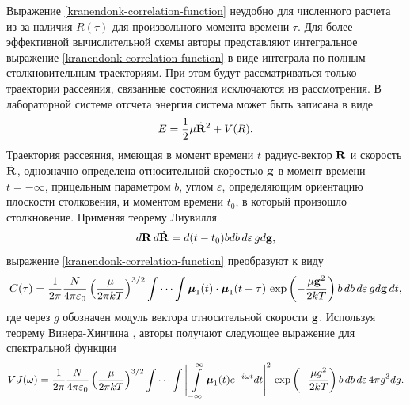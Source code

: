 Выражение \eqref{kranendonk-correlation-function} неудобно для численного расчета из-за наличия $R(\tau)$ для произвольного момента времени $\tau$. Для более эффективной вычислительной схемы авторы \cite{kranendonk1973} представляют интегральное выражение \eqref{kranendonk-correlation-function} в виде интеграла по полным столкновительным траекториям. При этом будут рассматриваться только траектории рассеяния, связанные состояния исключаются из рассмотрения. В лабораторной системе отсчета энергия система может быть записана в виде
\begin{gather}
    E = \frac{1}{2} \mu \dot{\mathbf{R}}^2 + V(R).
\end{gather}
Траектория рассеяния, имеющая в момент времени $t$ радиус-вектор $\mathbf{R}$ и скорость $\dot{\mathbf{R}}$, однозначно определена относительной скоростью $\mathbf{g}$ в момент времени $t = -\infty$, прицельным параметром $b$, углом $\varepsilon$, определяющим ориентацию плоскости столковения, и моментом времени $t_0$, в который произошло столкновение. Применяя теорему Лиувилля
\begin{gather}
    d \mathbf{R} \, d\dot{\mathbf{R}} = d(t - t_0) b db \, d\varepsilon \, g d\mathbf{g},
\end{gather}
%
выражение \eqref{kranendonk-correlation-function} преобразуют к виду
\begin{gather}
    C(\tau) = \frac{1}{2 \pi} \frac{N}{4 \pi \varepsilon_0} \left( \frac{\mu}{2 \pi k T} \right)^{3/2} \idotsint \boldsymbol{\mu}_1(t) \cdot \boldsymbol{\mu}_1(t + \tau) \, \exp \left( - \frac{\mu \mathbf{g}^2}{2 k T} \right) b \, db \, d\varepsilon \, g d \mathbf{g} \, dt, \label{correlation-function-kranendonk}
\end{gather}
%
где через $g$ обозначен модуль вектора относительной скорости $\mathbf{g}$. Используя теорему Винера-Хинчина \cite{frommhold}, авторы \cite{kranendonk1973} получают следующее выражение для спектральной функции 
\begin{gather}
    VJ(\omega) = \frac{1}{2 \pi} \frac{N}{4\pi \varepsilon_0} \left( \frac{\mu}{2 \pi k T} \right)^{3/2} \idotsint \Bigg\vert \int\limits_{-\infty}^\infty \boldsymbol{\mu}_1(t) e^{-i \omega t} dt \Bigg\vert^2 \, \exp \left( -\frac{\mu g^2}{2 k T} \right) b \, db \, d \varepsilon \, 4 \pi g^3 dg. \label{spectral-function-kranendonk}
\end{gather}

